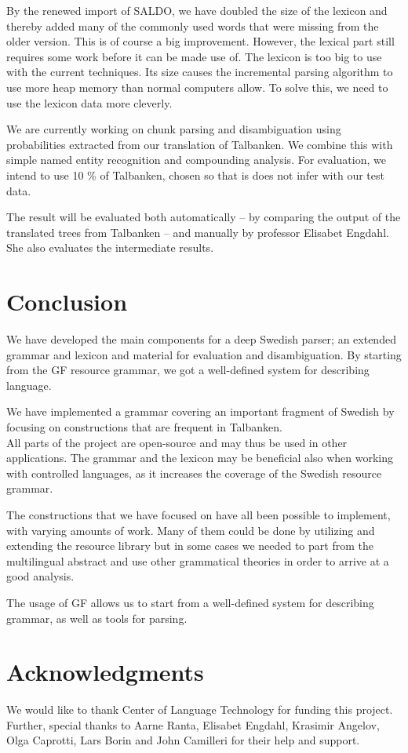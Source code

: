 \documentclass[10pt, a4paper]{article}
\begin{document}
By the renewed import of SALDO, we have doubled the size of the lexicon and thereby
added many of the commonly used words that were missing from the older
version. This is of course a big improvement.
However, the lexical part still requires some work before it can be made use of.
The lexicon is too big to use with the current techniques. Its size causes the
incremental parsing algorithm to use more heap memory than normal computers
allow. To solve this, we need to use the lexicon data more cleverly.

We are currently working on chunk parsing and disambiguation using probabilities
extracted from our translation of Talbanken. We combine this with simple named
entity recognition and compounding analysis. For evaluation, we intend to use
10 \% of Talbanken, chosen so that is does not infer with our test data.

The result will be evaluated both automatically -- by comparing the output of
the translated trees from Talbanken -- and manually by professor Elisabet Engdahl.
She also evaluates the intermediate results.

\section{Conclusion}
We have developed the main components
for a deep Swedish parser; an extended grammar and lexicon and material for
evaluation and disambiguation.
By starting from the GF resource grammar, we got a well-defined system for
describing language. 

We have implemented a grammar covering an important fragment of Swedish by
focusing on constructions that are frequent in Talbanken.
\\

All parts of the project are open-source and may thus be used in other applications.
The grammar and the lexicon may be beneficial also when working with controlled languages,
as it increases the coverage of the Swedish resource grammar.

The constructions
that we have focused on have all been possible to implement, with varying  amounts
of work. Many of them could be done by utilizing and extending the resource library
but in some cases we needed to part from the multilingual abstract and use other
grammatical theories in order to arrive at a good analysis.


The usage of GF allows us to start from
a well-defined system for describing grammar, as well as tools for
parsing.

\section{Acknowledgments}
We would like to thank Center of Language Technology for funding this project.
Further, special thanks to Aarne Ranta,
Elisabet Engdahl, Krasimir Angelov, Olga Caprotti, Lars Borin and John Camilleri for their help
and support.



\end{document}
